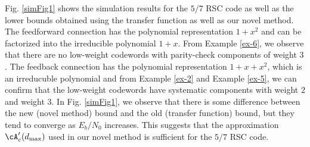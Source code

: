 Fig. \ref{simFig1} shows the simulation results for the $5/7$ RSC code as well as the lower bounds obtained using the transfer function as well as our novel method. The feedforward connection has the polynomial representation $1+x^2$ and can be factorized into the irreducible polynomial $1+x$. From Example \ref{ex-6}, we observe that there are no low-weight codewords with parity-check components of weight $3$. 
The feedback connection has the polynomial representation $1+x+x^2$, which is an irreducuble polynomial and from Example \ref{ex-2} and Example \ref{ex-5}, we can confirm that the low-weight codewords have systematic components with weight $2$ and weight $3$. In Fig. \ref{simFig1}, we observe that there is some difference between the new (novel method) bound and the old (transfer function) bound, but they tend to converge as $E_b/N_0$ increases. This suggests that the approximation $\cA'_c(d_{\text{max}})$ used in our novel method is sufficient for the $5/7$ RSC code.





